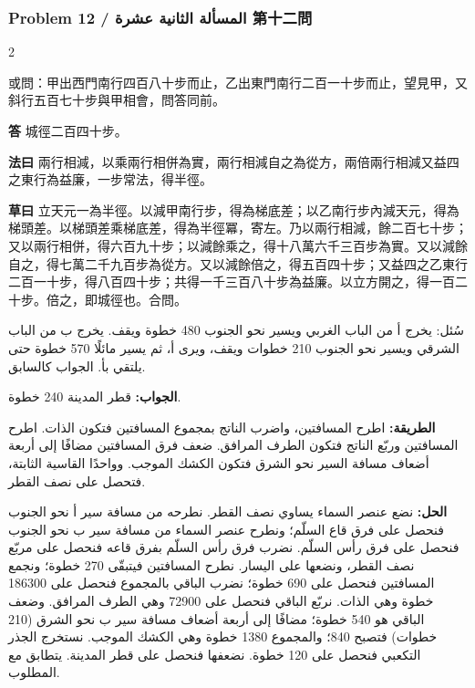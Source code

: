 \documentclass[11pt,a4paper]{article}
\newcommand{\ar}[1]{\arabicfont\beginR #1\endR}
\newcommand{\Answer}[1]{\par\noindent\textbf{\color{problemcolor}答} #1\par}
\newcommand{\Method}[1]{\par\noindent\textbf{\color{problemcolor}法曰} #1\par}
\newcommand{\Workings}[1]{\par\noindent\textbf{\color{problemcolor}草曰} #1\par}
\newcommand{\AnswerAr}{\par\noindent\textbf{\color{problemcolor}\ar{الجواب:}} }
\newcommand{\MethodAr}{\par\noindent\textbf{\color{problemcolor}\ar{الطريقة:}} }
\newcommand{\WorkingsAr}{\par\noindent\textbf{\color{problemcolor}\ar{الحل:}} }
\begin{document}
\vspace{0.5cm}

\subsubsection*{Problem 12 / \ar{المسألة الثانية عشرة} \quad 第十二問}

\begin{paracol}{2}

\noindent 或問：甲出西門南行四百八十步而止，乙出東門南行二百一十步而止，望見甲，又斜行五百七十步與甲相會，問答同前。

\vspace{0.2cm}

\Answer{城徑二百四十步。}

\vspace{0.2cm}

\Method{兩行相減，以乘兩行相併為實，兩行相減自之為從方，兩倍兩行相減又益四之東行為益廉，一步常法，得半徑。}

\vspace{0.2cm}

\Workings{立天元一為半徑。以減甲南行步，得為梯底差；以乙南行步內減天元，得為梯頭差。以梯頭差乘梯底差，得為半徑冪，寄左。乃以兩行相減，餘二百七十步；又以兩行相併，得六百九十步；以減餘乘之，得十八萬六千三百步為實。又以減餘自之，得七萬二千九百步為從方。又以減餘倍之，得五百四十步；又益四之乙東行二百一十步，得八百四十步；共得一千三百八十步為益廉。以立方開之，得一百二十步。倍之，即城徑也。合問。}

\switchcolumn

\ar{سُئل: يخرج أ من الباب الغربي ويسير نحو الجنوب 480 خطوة ويقف. يخرج ب من الباب الشرقي ويسير نحو الجنوب 210 خطوات ويقف، ويرى أ، ثم يسير مائلًا 570 خطوة حتى يلتقي بأ. الجواب كالسابق.}

\vspace{0.2cm}

\AnswerAr{قطر المدينة 240 خطوة.}

\vspace{0.2cm}

\MethodAr{اطرح المسافتين، واضرب الناتج بمجموع المسافتين فتكون الذات. اطرح المسافتين وربّع الناتج فتكون الطرف المرافق. ضعف فرق المسافتين مضافًا إلى أربعة أضعاف مسافة السير نحو الشرق فتكون الكشك الموجب. وواحدًا القاسية الثابتة، فتحصل على نصف القطر.}

\vspace{0.2cm}

\WorkingsAr{نضع عنصر السماء يساوي نصف القطر. نطرحه من مسافة سير أ نحو الجنوب فنحصل على فرق قاع السلّم؛ ونطرح عنصر السماء من مسافة سير ب نحو الجنوب فنحصل على فرق رأس السلّم. نضرب فرق رأس السلّم بفرق قاعه فنحصل على مربّع نصف القطر، ونضعها على اليسار. نطرح المسافتين فيتبقّى 270 خطوة؛ ونجمع المسافتين فنحصل على 690 خطوة؛ نضرب الباقي بالمجموع فنحصل على 186300 خطوة وهي الذات. نربّع الباقي فنحصل على 72900 وهي الطرف المرافق. وضعف الباقي هو 540 خطوة؛ مضافًا إلى أربعة أضعاف مسافة سير ب نحو الشرق (210 خطوات) فتصبح 840؛ والمجموع 1380 خطوة وهي الكشك الموجب. نستخرج الجذر التكعبي فنحصل على 120 خطوة. نضعفها فنحصل على قطر المدينة. يتطابق مع المطلوب.}

\end{paracol}
\end{document}
